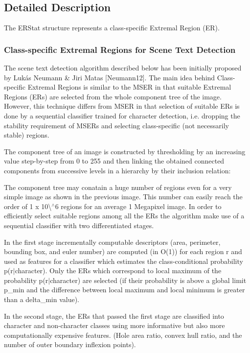 \subsection{Detailed Description}
The E\+R\+Stat structure represents a class-\/specific Extremal Region (ER). 

\subsubsection*{Class-\/specific Extremal Regions for Scene Text Detection }

The scene text detection algorithm described below has been initially proposed by Lukás Neumann \& Jiri Matas \mbox{[}Neumann12\mbox{]}. The main idea behind Class-\/specific Extremal Regions is similar to the M\+S\+ER in that suitable Extremal Regions (E\+Rs) are selected from the whole component tree of the image. However, this technique differs from M\+S\+ER in that selection of suitable E\+Rs is done by a sequential classifier trained for character detection, i.\+e. dropping the stability requirement of M\+S\+E\+Rs and selecting class-\/specific (not necessarily stable) regions. 

The component tree of an image is constructed by thresholding by an increasing value step-\/by-\/step from 0 to 255 and then linking the obtained connected components from successive levels in a hierarchy by their inclusion relation\+: 

 

The component tree may conatain a huge number of regions even for a very simple image as shown in the previous image. This number can easily reach the order of 1 x 10\textbackslash{}$^\wedge$6 regions for an average 1 Megapixel image. In order to efficiently select suitable regions among all the E\+Rs the algorithm make use of a sequential classifier with two differentiated stages. 

In the first stage incrementally computable descriptors (area, perimeter, bounding box, and euler number) are computed (in O(1)) for each region r and used as features for a classifier which estimates the class-\/conditional probability p(r$\vert$character). Only the E\+Rs which correspond to local maximum of the probability p(r$\vert$character) are selected (if their probability is above a global limit p\+\_\+min and the difference between local maximum and local minimum is greater than a delta\+\_\+min value). 

In the second stage, the E\+Rs that passed the first stage are classified into character and non-\/character classes using more informative but also more computationally expensive features. (Hole area ratio, convex hull ratio, and the number of outer boundary inflexion points). 

